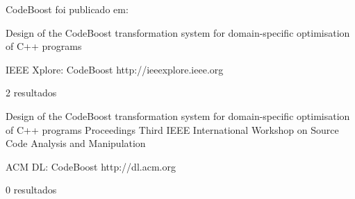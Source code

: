 CodeBoost foi publicado em:

Design of the CodeBoost transformation system for domain-specific optimisation of C++ programs

IEEE Xplore: CodeBoost
http://ieeexplore.ieee.org

2 resultados

Design of the CodeBoost transformation system for domain-specific optimisation of C++ programs
Proceedings Third IEEE International Workshop on Source Code Analysis and Manipulation

ACM DL: CodeBoost
http://dl.acm.org

0 resultados
